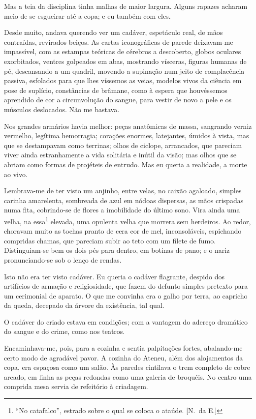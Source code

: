 Mas a teia da disciplina tinha malhas de maior largura. Alguns
rapazes acharam meio de se esgueirar até a copa; e eu também com eles.

Desde muito, andava querendo ver um cadáver, espetáculo real, de mãos
contraídas, revirados beiços. As cartas iconográficas de parede
deixavam{}-me impassível, com as estampas teóricas de cérebros a
descoberto, globos oculares exorbitados, ventres golpeados em abas,
mostrando vísceras, figuras humanas de pé, descansando a um quadril,
movendo a supinação num jeito de complacência passiva, esfolados para
que lhes víssemos as veias, modelos vivos da ciência em pose de
suplício, constâncias de brâmane, como à espera que houvéssemos
aprendido de cor a circunvolução do sangue, para vestir de novo a pele
e os músculos deslocados. Não me bastava. 

Nos grandes armários havia
melhor: peças anatômicas de massa, sangrando verniz vermelho, legítima
hemorragia; corações enormes, latejantes, úmidos à vista, mas que se
destampavam como terrinas; olhos de ciclope, arrancados, que pareciam
viver ainda estranhamente a vida solitária e inútil da visão; mas olhos
que se abriam como formas de projéteis de entrudo. Mas eu queria a
realidade, a morte ao vivo. 

Lembrava{}-me de ter visto um anjinho,
entre velas, no caixão agaloado, simples carinha amarelenta, sombreada
de azul em nódoas dispersas, as mãos crispadas numa fita, cobrindo{}-se
de flores a imobilidade do último sono. Vira ainda uma velha, na essa\footnote{ ``No catafalco'', 
estrado sobre o qual se coloca o ataúde. [N.~da E.]} elevada, uma opulenta 
velha que morrera sem herdeiros. Ao redor,
choravam muito as tochas pranto de cera cor de mel, inconsoláveis,
espichando compridas chamas, que pareciam subir ao teto com um filete
de fumo. Distinguiam{}-se bem os dois pés para dentro, em botinas de
pano; e o nariz pronunciando{}-se sob o lenço de rendas. 


Isto não era
ter visto cadáver. Eu queria o cadáver flagrante, despido dos
artifícios de armação e religiosidade, que fazem do defunto simples
pretexto para um cerimonial de aparato. O que me convinha era o galho
por terra, ao capricho da queda, decepado da árvore da existência, tal
qual. 

O cadáver do criado estava em condições; com a vantagem do
adereço dramático do sangue e do crime, como nos teatros.

Encaminhava{}-me, pois, para a cozinha e sentia palpitações fortes,
abalando{}-me certo modo de agradável pavor. A cozinha do Ateneu, além
dos alojamentos da copa, era espaçosa como um salão. Às paredes
cintilava o trem completo de cobre areado, em linha as peças redondas
como uma galeria de broquéis. No centro uma comprida mesa servia de
refeitório à criadagem. 


